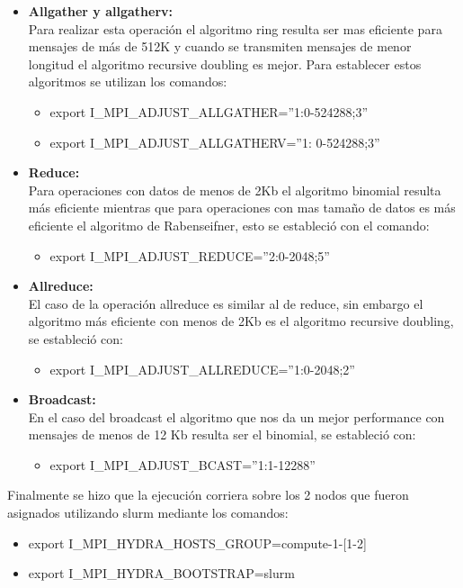 \documentclass[conference,compsoc]{IEEEtran}
\begin{document}
\begin{itemize}
    \item \textbf{Allgather y allgatherv:}\\
    Para realizar esta operación el algoritmo ring resulta ser mas eficiente para mensajes de más de 512K y cuando se transmiten mensajes de menor longitud el algoritmo recursive doubling es mejor. Para establecer estos algoritmos se utilizan los comandos:\\
    \begin{itemize}
        \item export I\_MPI\_ADJUST\_ALLGATHER=”1:0-524288;3”
        \item export I\_MPI\_ADJUST\_ALLGATHERV=”1: 0-524288;3”
    \end{itemize}
    \item \textbf{Reduce:}\\
    Para operaciones con datos de menos de 2Kb el algoritmo binomial resulta más eficiente mientras que para operaciones con mas tamaño de datos es más eficiente el algoritmo de Rabenseifner, esto se estableció con el comando:
    \begin{itemize}
        \item export I\_MPI\_ADJUST\_REDUCE=”2:0-2048;5”
    \end{itemize}
    \item \textbf{Allreduce:}\\
    El caso de la operación allreduce es similar al de reduce, sin embargo el algoritmo más eficiente con menos de 2Kb es el algoritmo recursive doubling, se estableció con:
    \begin{itemize}
        \item export I\_MPI\_ADJUST\_ALLREDUCE=”1:0-2048;2”
    \end{itemize}
    \item \textbf{Broadcast:}\\
    En el caso del broadcast el algoritmo que nos da un mejor performance con mensajes de menos de 12 Kb resulta ser el binomial, se estableció con:
    \begin{itemize}
        \item export I\_MPI\_ADJUST\_BCAST=”1:1-12288”
    \end{itemize}
\end{itemize}

Finalmente se hizo que la ejecución corriera sobre los 2 nodos que fueron asignados utilizando slurm mediante los comandos:
\begin{itemize}
    \item export I\_MPI\_HYDRA\_HOSTS\_GROUP=compute-1-[1-2]
    \item export I\_MPI\_HYDRA\_BOOTSTRAP=slurm
\end{itemize}
\end{document}
